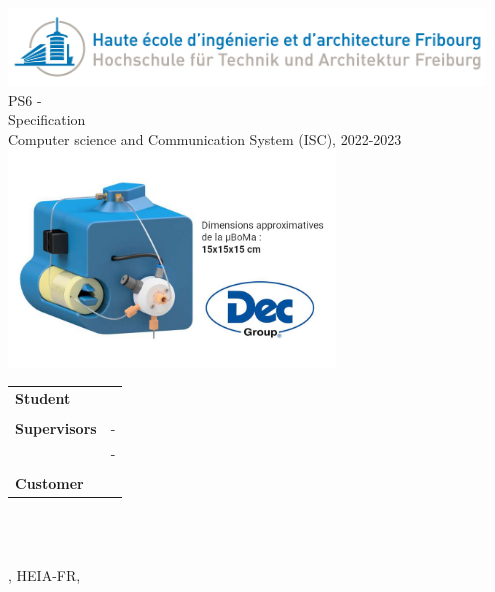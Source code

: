 
\begin{titlepage}
	{\selectfont
		\begin{center}
			\includegraphics[width=0.95\textwidth]{img/heiafr_logo}
			~\\[1.5cm]
			{
				\Huge
				PS6 - \ThesisTitle\\Specification \\[0.5cm]
				\large Computer science and Communication System (ISC), 2022-2023\\[2cm]
			}
			\includegraphics[width=0.65\textwidth]{img/logo.png}
			~\\[2cm]
			{
				\begin{center}
				\begin{tabularx}{\textwidth} { %
					>{\raggedright\arraybackslash}X
					>{\raggedright\arraybackslash}X  }
						 \textbf{Student} & \Author\\
						 & \\
						 \textbf{Supervisors} & \Advisor \space - \AdvisorSchool \\ & \AdvisorTwo \space - \AdvisorTwoSchool \\
						 & \\
						 \textbf{Customer} & \Mendant\\
				\end{tabularx}
				\end{center}
				~\\[1.5cm]
			}

			\vfill



			{\specificationVersion}\\
			{\large \Place, HEIA-FR, \Date}

		\end{center}
	}
	\restoregeometry
	\end{titlepage}




